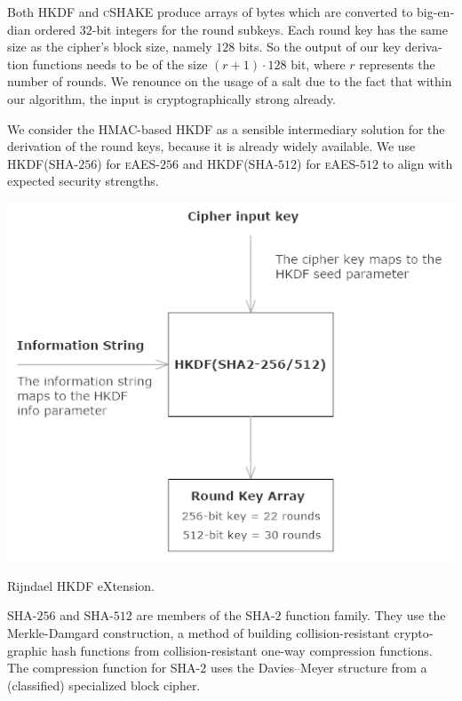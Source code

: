 \documentclass[a4paper,11pt]{article}
\begin{document}
\begin{otherlanguage}{english}
\begin{multicols}{2}
\noindent
Both \textsc{HKDF} and \textsc{cSHAKE} produce arrays of bytes which are converted to big-endian ordered $32$-bit integers for the round subkeys. Each round key has the same size as the cipher's block size, namely $128$ bits. So the output of our key derivation functions needs to be of the size $(r + 1)\cdot 128$ bit, where $r$ represents the number of rounds. We renounce on the usage of a salt due to the fact that within our algorithm, the input is cryptographically strong already.

\noindent
We consider the \textsc{HMAC}-based \textsc{HKDF} as a sensible intermediary solution for the derivation of the round keys, because it is already widely available. We use \textsc{HKDF}(\textsc{SHA}-$256$) for \textsc{eAES}-$256$ and \textsc{HKDF}(\textsc{SHA}-$512$) for \textsc{eAES}-$512$ to align with expected security strengths. 

\begin{figurehere}
  \centering
  \includegraphics[width=\columnwidth]{RHX-schematic.png}
  \caption{Rijndael HKDF eXtension.\label{abb_3}}
\end{figurehere}

\vspace{0.3cm}
\noindent
\textsc{SHA}-$256$ and \textsc{SHA}-$512$ are members of the \textsc{SHA}-$2$ function family. They use the Merkle-Damgard construction, a method of building collision-resistant cryptographic hash functions from collision-resistant one-way compression functions. The compression function for \textsc{SHA}-$2$ uses the Davies–Meyer structure from a (classified) specialized block cipher. \\ 


\end{multicols}
\end{otherlanguage}
\end{document}
